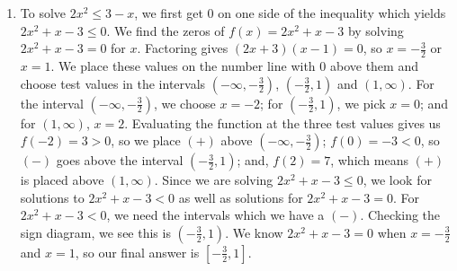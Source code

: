{
\begin{enumerate}

\item  To solve $2x^2 \leq 3-x$, we first get $0$ on one side of the inequality which yields $2x^2+x-3 \leq 0$.  We find the zeros of $f(x) = 2x^2 + x - 3$ by solving $2x^2 + x - 3 = 0$ for $x$.  Factoring gives $(2x+3)(x-1)=0$, so $x = -\frac{3}{2}$ or $x = 1$.  We place these values on the number line with $0$ above them and choose test values in the intervals $\left(-\infty, -\frac{3}{2}\right)$, $\left(-\frac{3}{2},1\right)$ and $(1,\infty)$.  For the interval  $\left(-\infty, -\frac{3}{2}\right)$, we choose $x=-2$; for $\left(-\frac{3}{2},1\right)$, we pick $x=0$; and for $(1,\infty)$, $x=2$. Evaluating the function at the three test values gives us $f(-2) = 3 > 0$, so we place $(+)$ above $\left(-\infty, -\frac{3}{2}\right)$;  $f(0)=-3 < 0$, so $(-)$ goes above the interval $\left(-\frac{3}{2},1\right)$;  and, $f(2) = 7$, which means $(+)$ is placed above $(1,\infty)$.  Since we are solving $2x^2+x-3 \leq 0$, we look for solutions to $2x^2+x-3 < 0$ as well as solutions for $2x^2+x-3 =0$.  For $2x^2+x-3 < 0$, we need the intervals which we have a $(-)$.  Checking the sign diagram, we see this is $\left(-\frac{3}{2},1\right)$.  We know $2x^2+x-3 =0$ when $x=-\frac{3}{2}$ and $x=1$, so our final answer is $\left[-\frac{3}{2},1\right]$.  




\end{enumerate}}
